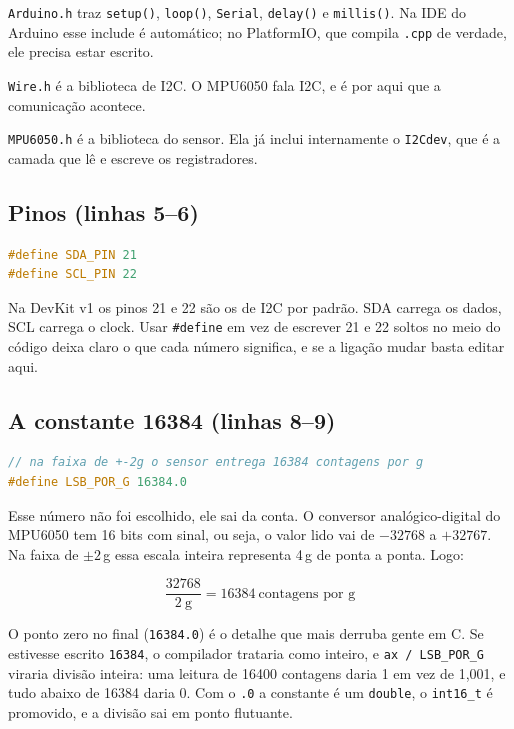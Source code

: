 \documentclass[11pt,a4paper]{article}
\begin{document}
\texttt{Arduino.h} traz \texttt{setup()}, \texttt{loop()}, \texttt{Serial},
\texttt{delay()} e \texttt{millis()}. Na IDE do Arduino esse include é
automático; no PlatformIO, que compila \texttt{.cpp} de verdade, ele precisa
estar escrito.

\texttt{Wire.h} é a biblioteca de I2C. O MPU6050 fala I2C, e é por aqui que a
comunicação acontece.

\texttt{MPU6050.h} é a biblioteca do sensor. Ela já inclui internamente o
\texttt{I2Cdev}, que é a camada que lê e escreve os registradores.

\subsection{Pinos (linhas 5--6)}

\begin{lstlisting}[language=C++,firstnumber=5]
#define SDA_PIN 21
#define SCL_PIN 22
\end{lstlisting}

Na DevKit v1 os pinos 21 e 22 são os de I2C por padrão. SDA carrega os dados,
SCL carrega o clock. Usar \texttt{\#define} em vez de escrever 21 e 22 soltos
no meio do código deixa claro o que cada número significa, e se a ligação
mudar basta editar aqui.

\subsection{A constante 16384 (linhas 8--9)}

\begin{lstlisting}[language=C++,firstnumber=8]
// na faixa de +-2g o sensor entrega 16384 contagens por g
#define LSB_POR_G 16384.0
\end{lstlisting}

Esse número não foi escolhido, ele sai da conta. O conversor
analógico-digital do MPU6050 tem 16 bits com sinal, ou seja, o valor lido vai
de $-32768$ a $+32767$. Na faixa de $\pm 2$\,g essa escala inteira representa
4\,g de ponta a ponta. Logo:

\[
\frac{32768}{2\ \mathrm{g}} = 16384 \ \text{contagens por g}
\]

O ponto zero no final (\texttt{16384.0}) é o detalhe que mais derruba gente em
C. Se estivesse escrito \texttt{16384}, o compilador trataria como inteiro, e
\texttt{ax / LSB\_POR\_G} viraria divisão inteira: uma leitura de 16400
contagens daria 1 em vez de 1{,}001, e tudo abaixo de 16384 daria 0. Com o
\texttt{.0} a constante é um \texttt{double}, o \texttt{int16\_t} é promovido,
e a divisão sai em ponto flutuante.
\end{document}
